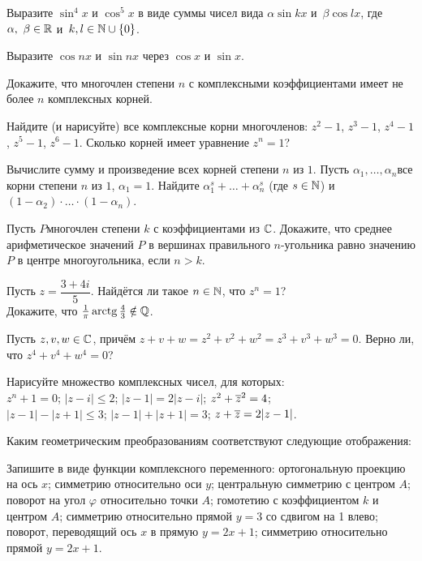 \documentclass[a4paper,12pt]{article}
\begin{document}
Выразите $\sin^4x$ и $\cos^5x$ в виде суммы чисел вида $\alpha\sin{kx}$ и~$\beta\cos{lx}$, где $\alpha,\ \beta\in\mathbb{R}$ и~$k,l\in\mathbb{N}\cup\{0\}$.


Выразите $\cos nx$ и $\sin nx$ через $\cos{x}$ и $\sin{x}$.

Докажите, что многочлен степени $n$ с комплексными коэффициентами имеет не более $n$ комплексных корней.


Найдите (и нарисуйте) все комплексные корни многочленов: $z^2-1$, $z^3-1$, $z^4-1$,
$z^5-1$, $z^6-1$.
Сколько корней имеет уравнение $z^n=1$?

Вычислите сумму и произведение всех корней степени $n$ из $1$.
Пусть $\alpha_1, \ldots, \alpha_n$\т все корни степени $n$ из $1$, $\alpha_1=1$. Найдите $\alpha_1^s+\ldots+\alpha_n^s$ (где $s\in\mathbb{N}$) и $(1-\alpha_2)\cdot\ldots\cdot(1-\alpha_n)$.

Пусть $P$\т многочлен степени $k$ с коэффициентами из $\mathbb{C}$. Докажите, что среднее арифметическое значений $P$ в вершинах правильного $n$-угольника равно значению $P$ в центре многоугольника, если $n>k$.

Пусть $z=\dfrac{3+4i}{5}$. Найдётся ли такое $n\in\mathbb{N}$, что $z^n=1$?
\\
Докажите, что $\frac1\pi\arctg\frac43\notin\Q$.

Пусть $z,v,w\in\mathbb{C}$, причём $z+v+w=z^2+v^2+w^2=z^3+v^3+w^3=0$. Верно ли, что $z^4+v^4+w^4=0$?

Нарисуйте множество комплексных чисел, для которых:\\
 $z^n+1=0$;
 $|z-i|\leq2$;
 $|z-1|=2|z-i|$;
 $z^2+\overline z^2=4$;\\
 $|z-1|-|z+1|\leq3$;
 $|z-1|+|z+1|=3$;
 $z+\overline z=2|z-1|$.


Каким геометрическим преобразованиям соответствуют следующие отображения:

Запишите в виде функции комплексного переменного:
 ортогональную проекцию на ось $x$;
 симметрию относительно оси $y$;
 центральную симметрию с центром $A$;
 поворот на угол $\varphi$ относительно точки $A$;
 гомотетию с коэффициентом $k$ и центром $A$;
 симметрию относительно прямой $y=3$ со сдвигом на 1 влево;
 поворот, переводящий ось $x$ в прямую $y=2x+1$;
 симметрию относительно прямой $y=2x+1$.
\end{document}
